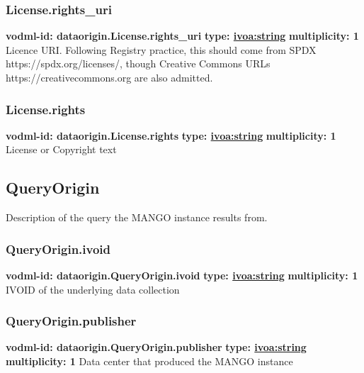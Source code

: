     \subsubsection{License.rights\_uri}
      \textbf{vodml-id: dataorigin.License.rights\_uri} \newline
      \textbf{type: \hyperref[sect:ivoa]{ivoa:string}} \newline
      \textbf{multiplicity: 1} \newline
      Licence URI. Following Registry practice, this should come from SPDX https://spdx.org/licenses/, though Creative Commons URLs https://creativecommons.org are also admitted.

    \subsubsection{License.rights}
      \textbf{vodml-id: dataorigin.License.rights} \newline
      \textbf{type: \hyperref[sect:ivoa]{ivoa:string}} \newline
      \textbf{multiplicity: 1} \newline
      License or Copyright text

  \subsection{QueryOrigin}
  \label{sect:dataorigin.QueryOrigin}
    Description of the query the MANGO instance results from.

    \subsubsection{QueryOrigin.ivoid}
      \textbf{vodml-id: dataorigin.QueryOrigin.ivoid} \newline
      \textbf{type: \hyperref[sect:ivoa]{ivoa:string}} \newline
      \textbf{multiplicity: 1} \newline
      IVOID of the underlying data collection

    \subsubsection{QueryOrigin.publisher}
      \textbf{vodml-id: dataorigin.QueryOrigin.publisher} \newline
      \textbf{type: \hyperref[sect:ivoa]{ivoa:string}} \newline
      \textbf{multiplicity: 1} \newline
      Data center that produced the MANGO instance

